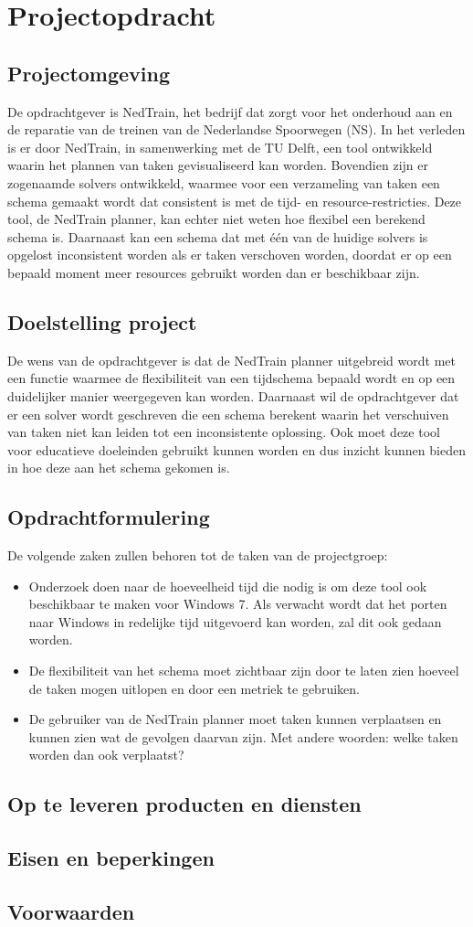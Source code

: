 \section{Projectopdracht}
\subsection{Projectomgeving}
De opdrachtgever is NedTrain, het bedrijf dat zorgt voor het onderhoud aan en de reparatie van de treinen van de Nederlandse Spoorwegen (NS). In het verleden is er door NedTrain, in samenwerking met de TU Delft, een tool ontwikkeld waarin het plannen van taken gevisualiseerd kan worden. Bovendien zijn er zogenaamde solvers ontwikkeld, waarmee voor een verzameling van taken een schema gemaakt wordt dat consistent is met de tijd- en resource-restricties. Deze tool, de NedTrain planner, kan echter niet weten hoe flexibel een berekend schema is. Daarnaast kan een schema dat met \'e\'en van de huidige solvers is opgelost inconsistent worden als er taken verschoven worden, doordat er op een bepaald moment meer resources gebruikt worden dan er beschikbaar zijn.

\subsection{Doelstelling project}
De wens van de opdrachtgever is dat de NedTrain planner uitgebreid wordt met een functie waarmee de flexibiliteit van een tijdschema bepaald wordt en op een duidelijker manier weergegeven kan worden. Daarnaast wil de opdrachtgever dat er een solver wordt geschreven die een schema berekent waarin het verschuiven van taken niet kan leiden tot een inconsistente oplossing. Ook moet deze tool voor educatieve doeleinden gebruikt kunnen worden en dus inzicht kunnen bieden in hoe deze aan het schema gekomen is.


\subsection{Opdrachtformulering}
De volgende zaken zullen behoren tot de taken van de projectgroep:
\begin{itemize}
	\item Onderzoek doen naar de hoeveelheid tijd die nodig is om deze tool ook beschikbaar te maken voor Windows 7. Als verwacht wordt dat het porten naar Windows in redelijke tijd uitgevoerd kan worden, zal dit ook gedaan worden. 
	\item De flexibiliteit van het schema moet zichtbaar zijn door te laten zien hoeveel de taken mogen uitlopen en door een metriek te gebruiken. 
	\item De gebruiker van de NedTrain planner moet taken kunnen verplaatsen en kunnen zien wat de gevolgen daarvan zijn. Met andere woorden: welke taken worden dan ook verplaatst?
\end{itemize}

\subsection{Op te leveren producten en diensten}
\subsection{Eisen en beperkingen}
\subsection{Voorwaarden}
